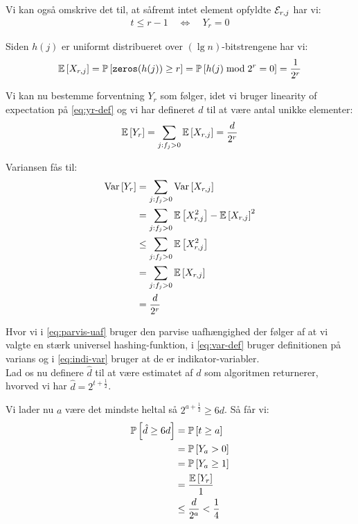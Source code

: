 Vi kan også omskrive det til, at såfremt intet element opfyldte ${\mathcal{E}}_{r,j}$ har vi:
\begin{align}
  t \leq r - 1 \quad \Longleftrightarrow \quad Y_r = 0 \label{eq:t-leq-r}
\end{align}

Siden $h(j)$ er uniformt distribueret over $(\lg n)$-bitstrengene har vi:
$$
\mathbb{E} \left[  X_{r,j}  \right] = \mathbb{P} \left[  \mathtt{zeros}(h(j)) \geq r  \right] = \mathbb{P} \left[  h(j) \bmod 2^r = 0  \right] = \frac{1}{2^r}
$$

Vi kan nu bestemme forventning $Y_r$ som følger, idet vi bruger linearity of expectation på \cref{eq:yr-def} og vi har defineret $d$ til at være antal unikke elementer:
\begin{align}
  \mathbb{E} \left[  Y_r  \right] = \sum_{j: f_j > 0} \mathbb{E} \left[  X_{r,j}  \right] = \frac{d}{2^r}
\end{align}


Variansen fås til:
\begin{align}
  \text{Var} \left[  Y_r  \right]
  &= \sum_{j: f_j > 0} \text{Var} \left[  X_{r,j}  \right] \label{eq:parvis-uaf} \\
  &= \sum_{j: f_j > 0} \mathbb{E} \left[  X_{r,j}^2  \right] - \mathbb{E} \left[  X_{r,j}  \right]^2 \label{eq:var-def} \\
  &\leq \sum_{j: f_j > 0} \mathbb{E} \left[  X_{r,j}^2  \right] \nonumber \\
  &= \sum_{j: f_j > 0} \mathbb{E} \left[  X_{r,j}  \right] \label{eq:indi-var} \\
  &= \frac{d}{2^r} \nonumber
\end{align}

Hvor vi i \cref{eq:parvis-uaf} bruger den parvise uafhængighed der følger af at vi valgte en stærk universel hashing-funktion, i \cref{eq:var-def} bruger definitionen på varians og i \cref{eq:indi-var} bruger at de er indikator-variabler.\\

Lad os nu definere $\hat d$ til at være estimatet af $d$ som algoritmen returnerer, hvorved vi har $\hat d = 2^{t + \frac{1}{2}}$.

Vi lader nu $a$ være det mindste heltal så $2^{a + \frac{1}{2}} \geq 6d$. Så får vi:
\begin{align}
  \mathbb{P} \left[  \hat d \geq 6d  \right]
  &= \mathbb{P} \left[  t \geq a  \right] \label{eq:t-stoerre-a} \\
  &= \mathbb{P} \left[  Y_a > 0  \right] \label{eq:benyt-ulighed} \\
  &= \mathbb{P} \left[  Y_a \geq 1  \right] \nonumber \\
  &= \frac{\mathbb{E} \left[  Y_r  \right]}{1} \label{eq:benyt-markov} \\
  &\leq \frac{d}{2^a} < \frac{1}{4} \label{eq:benyt-forventet-yr}
\end{align}


